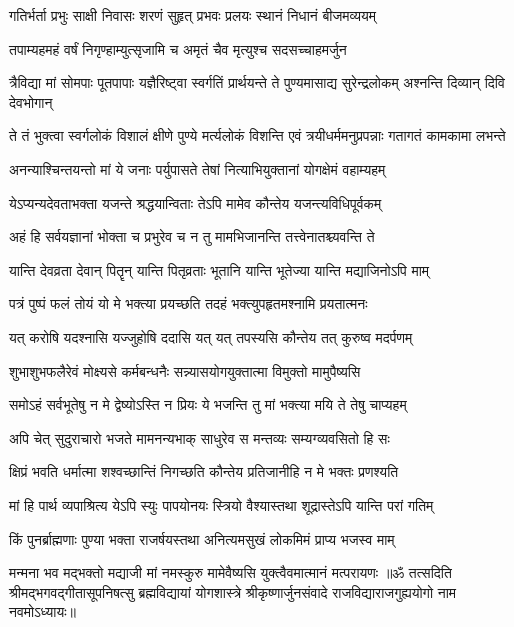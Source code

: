 \twolineshloka
{गतिर्भर्ता प्रभुः साक्षी निवासः शरणं सुहृत्}
{प्रभवः प्रलयः स्थानं निधानं बीजमव्ययम्}%

\twolineshloka
{तपाम्यहमहं वर्षं निगृण्हाम्युत्सृजामि च}
{अमृतं चैव मृत्युश्च सदसच्चाहमर्जुन}%

\fourlineindentedshloka
{त्रैविद्या मां सोमपाः पूतपापाः}
{यज्ञैरिष्ट्वा स्वर्गतिं प्रार्थयन्ते}
{ते पुण्यमासाद्य सुरेन्द्रलोकम्}
{अश्नन्ति दिव्यान् दिवि देवभोगान्}%

\fourlineindentedshloka
{ते तं भुक्त्वा स्वर्गलोकं विशालं}
{क्षीणे पुण्ये मर्त्यलोकं विशन्ति}
{एवं त्रयीधर्ममनुप्रपन्नाः}
{गतागतं कामकामा लभन्ते}%

\twolineshloka
{अनन्याश्चिन्तयन्तो मां ये जनाः पर्युपासते}
{तेषां नित्याभियुक्तानां योगक्षेमं वहाम्यहम्}%

\twolineshloka
{येऽप्यन्यदेवताभक्ता यजन्ते श्रद्धयान्विताः}
{तेऽपि मामेव कौन्तेय यजन्त्यविधिपूर्वकम्}%

\twolineshloka
{अहं हि सर्वयज्ञानां भोक्ता च प्रभुरेव च}
{न तु मामभिजानन्ति तत्त्वेनातश्च्यवन्ति ते}%

\twolineshloka
{यान्ति देवव्रता देवान् पितॄन् यान्ति पितृव्रताः}
{भूतानि यान्ति भूतेज्या यान्ति मद्याजिनोऽपि माम्}%

\twolineshloka
{पत्रं पुष्पं फलं तोयं यो मे भक्त्या प्रयच्छति}
{तदहं भक्त्युपहृतमश्नामि प्रयतात्मनः}%

\twolineshloka
{यत् करोषि यदश्नासि यज्जुहोषि ददासि यत्}
{यत् तपस्यसि कौन्तेय तत् कुरुष्व मदर्पणम्}%

\twolineshloka
{शुभाशुभफलैरेवं मोक्ष्यसे कर्मबन्धनैः}
{सन्न्यासयोगयुक्तात्मा विमुक्तो मामुपैष्यसि}%

\twolineshloka
{समोऽहं सर्वभूतेषु न मे द्वेष्योऽस्ति न प्रियः}
{ये भजन्ति तु मां भक्त्या मयि ते तेषु चाप्यहम्}%

\twolineshloka
{अपि चेत् सुदुराचारो भजते मामनन्यभाक्}
{साधुरेव स मन्तव्यः सम्यग्व्यवसितो हि सः}%

\twolineshloka
{क्षिप्रं भवति धर्मात्मा शश्वच्छान्तिं निगच्छति}
{कौन्तेय प्रतिजानीहि न मे भक्तः प्रणश्यति}%

\twolineshloka
{मां हि पार्थ व्यपाश्रित्य येऽपि स्युः पापयोनयः}
{स्त्रियो वैश्यास्तथा शूद्रास्तेऽपि यान्ति परां गतिम्}%

\twolineshloka
{किं पुनर्ब्राह्मणाः पुण्या भक्ता राजर्षयस्तथा}
{अनित्यमसुखं लोकमिमं प्राप्य भजस्व माम्}%

\twolineshloka
{मन्मना भव मद्भक्तो मद्याजी मां नमस्कुरु}
{मामेवैष्यसि युक्त्वैवमात्मानं मत्परायणः}%
{॥ॐ तत्सदिति श्रीमद्भगवद्गीतासूपनिषत्सु ब्रह्मविद्यायां योगशास्त्रे श्रीकृष्णार्जुनसंवादे राजविद्याराजगुह्ययोगो नाम नवमोऽध्यायः॥}
